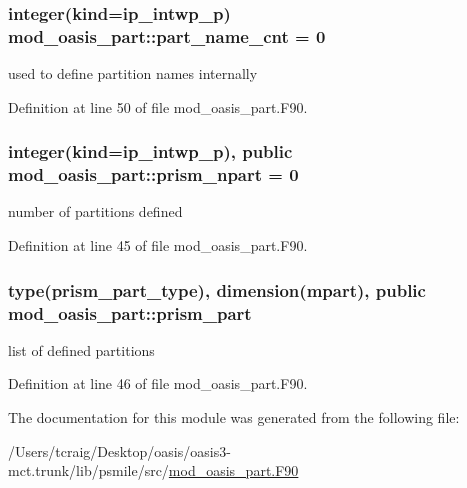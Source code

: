 \hypertarget{classmod__oasis__part_a8cee930f023feb7bcad4a0cab0b490a1}{
\subsubsection[{part\+\_\+name\+\_\+cnt}]{\setlength{\rightskip}{0pt plus 5cm}integer(kind=ip\+\_\+intwp\+\_\+p) mod\+\_\+oasis\+\_\+part\+::part\+\_\+name\+\_\+cnt = 0\hspace{0.3cm}{\ttfamily [private]}}}\label{classmod__oasis__part_a8cee930f023feb7bcad4a0cab0b490a1}


used to define partition names internally 



Definition at line 50 of file mod\+\_\+oasis\+\_\+part.\+F90.

\hypertarget{classmod__oasis__part_ac8340e63b159a9786ad8fffabd1d47f8}{
\subsubsection[{prism\+\_\+npart}]{\setlength{\rightskip}{0pt plus 5cm}integer(kind=ip\+\_\+intwp\+\_\+p), public mod\+\_\+oasis\+\_\+part\+::prism\+\_\+npart = 0}}\label{classmod__oasis__part_ac8340e63b159a9786ad8fffabd1d47f8}


number of partitions defined 



Definition at line 45 of file mod\+\_\+oasis\+\_\+part.\+F90.

\hypertarget{classmod__oasis__part_a326ce52f630ba7e71905af864a6cb2dc}{
\subsubsection[{prism\+\_\+part}]{\setlength{\rightskip}{0pt plus 5cm}type({\bf prism\+\_\+part\+\_\+type}), dimension({\bf mpart}), public mod\+\_\+oasis\+\_\+part\+::prism\+\_\+part}}\label{classmod__oasis__part_a326ce52f630ba7e71905af864a6cb2dc}


list of defined partitions 



Definition at line 46 of file mod\+\_\+oasis\+\_\+part.\+F90.



The documentation for this module was generated from the following file\+:\begin{DoxyCompactItemize}
\item 
/\+Users/tcraig/\+Desktop/oasis/oasis3-\/mct.\+trunk/lib/psmile/src/\hyperlink{mod__oasis__part_8_f90}{mod\+\_\+oasis\+\_\+part.\+F90}\end{DoxyCompactItemize}
